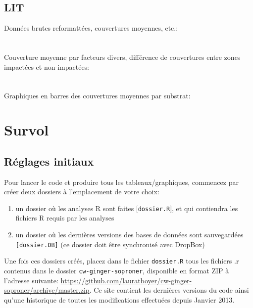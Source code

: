\documentclass{article}
\begin{document}
\subsection{LIT}
\noindent Données brutes reformattées, couvertures moyennes, etc.:\\
\hyperlink{l1} {}\\
\hyperlink{l2} {}\\

\noindent Couverture moyenne par facteurs divers, différence de
couvertures entre zones impactées et non-impactées:\\
\hyperlink{l3} {}\\
\hyperlink{l4} {}\\

\noindent Graphiques en barres des couvertures moyennes par substrat:\\
\hyperlink{l5} {}

\clearpage
\section{Survol}

\subsection{Réglages initiaux}
\label{reglages1}
Pour lancer le code et produire tous les tableaux/graphiques,
commencez par créer deux dossiers à l'emplacement de votre choix:

\begin{enumerate}
      \item un dossier où les analyses R sont faites
      [\texttt{dossier.R}], et qui contiendra les fichiers R requis par
      les analyses
  \item un dossier où les dernières versions des bases de données sont
    sauvegardées \texttt{[dossier.DB]} (ce dossier doit être
    synchronisé avec DropBox)
     \end{enumerate}

     Une fois ces dossiers créés, placez dans le fichier
     \texttt{dossier.R} tous les fichiers .r contenus dans le dossier
     \texttt{cw-ginger-soproner}, disponible en format ZIP à l'adresse
     suivante:
     \url{https://github.com/lauratboyer/cw-ginger-soproner/archive/master.zip}. Ce
     site contient les dernières versions du code ainsi qu'une
     historique de toutes les modifications effectuées depuis Janvier 2013.
\end{document}

